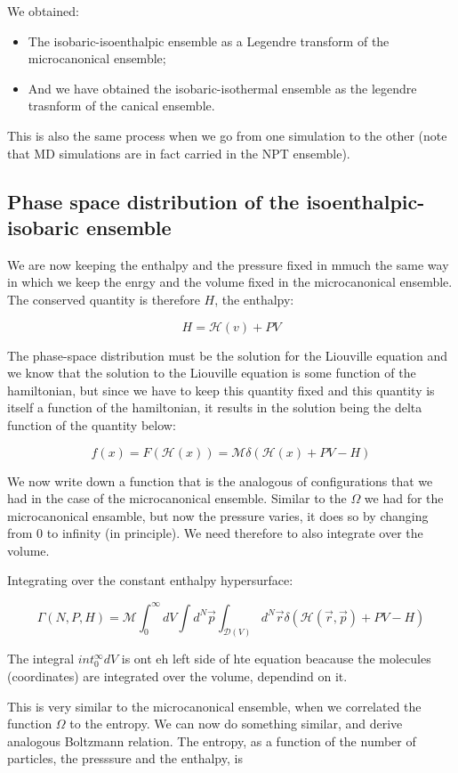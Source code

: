 	We obtained:
	\begin{itemize}
	\item The isobaric-isoenthalpic ensemble as a Legendre transform of the microcanonical ensemble;
	\item And we have obtained the isobaric-isothermal ensemble as the legendre trasnform of the canical ensemble.
	\end{itemize}
	
	This is also the same process when we go from one simulation to the other (note that MD simulations are in fact carried in the NPT ensemble).

	\subsection{Phase space distribution of the isoenthalpic-isobaric ensemble}
	We are now keeping the enthalpy and the pressure fixed in mmuch the same way in which we keep the enrgy and the volume fixed in the microcanonical ensemble. 
	The conserved quantity is therefore $H$, the enthalpy:

	$$H = \mathcal{H}(v) + PV$$
	
	The phase-space  distribution must be the solution for the Liouville equation and we know that the solution to the Liouville equation is some function of the hamiltonian, but since we have to keep this quantity fixed and this quantity is itself a function of the hamiltonian, it results in the solution being the delta function of the quantity below:

	$$f(x) = F(\mathcal{H}(x)) = \mathcal{M}\delta(\mathcal{H}(x)+PV-H)$$

	We now write down a function that is the analogous of configurations that we had in the case of the microcanonical ensemble. Similar to the $\Omega$ we had for the microcanonical ensamble, but now the pressure varies, it does so by changing from $0$ to infinity (in principle). We need therefore to also integrate over the volume. 
	
	Integrating over the constant enthalpy hypersurface:

	$$\Gamma(N, P, H) = \mathcal{M}\int_0^{\infty}dV\int d^N\vec{p}\int_{\mathcal{D}(V)}d^N\vec{r}\delta(\mathcal{H}(\vec{r}, \vec{p}) + PV-H)$$
	
	The integral $int_0^{\infty}dV$ is ont eh left side of hte equation beacause the molecules (coordinates) are integrated over the volume, dependind on it.
	
	This is very similar to the microcanonical ensemble, when we correlated the function $\Omega$ to the entropy. We can now do something similar, and derive analogous Boltzmann relation. The entropy, as a function of the number of particles, the presssure and the enthalpy, is
	
